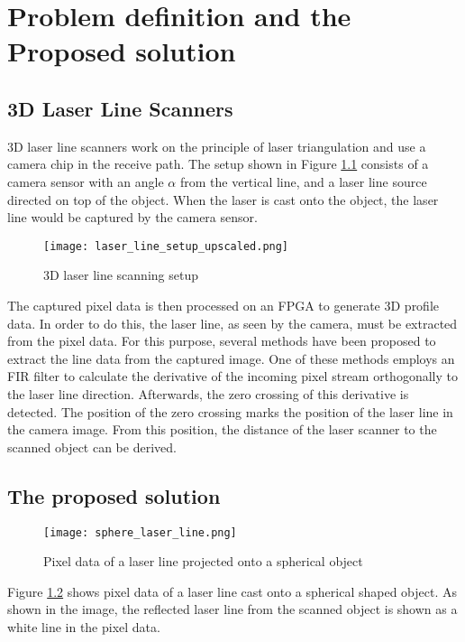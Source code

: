 \chapter{Problem definition and the Proposed solution}

\section{3D Laser Line Scanners}


3D laser line scanners work on the principle of laser triangulation and use a camera chip in the receive path. The setup shown in Figure \ref{fig:laser_line_setup} consists of a camera sensor with an angle $\alpha$ from the vertical line, and a laser line source directed on top of the object. When the laser is cast onto the object, the laser line would be captured by the camera sensor.


\begin{figure}[h]
    \centering
    \texttt{[image: laser\_line\_setup\_upscaled.png]}
    \caption{3D laser line scanning setup \cite{method_presentation}}
    \label{fig:laser_line_setup}
\end{figure}


The captured pixel data is then processed on an FPGA to generate 3D profile data. In order to do this, the laser line, as seen by the camera, must be extracted from the pixel data. For this purpose, several methods have been proposed to extract the line data from the captured image. One of these methods employs an FIR filter to calculate the derivative of the incoming pixel stream orthogonally to the laser line direction. Afterwards, the zero crossing of this derivative is detected. The position of the zero crossing marks the position of the laser line in the camera image. From this position, the distance of the laser scanner to the scanned object can be derived.


\section{The proposed solution}


\begin{figure}[h]
    \centering
    \texttt{[image: sphere\_laser\_line.png]}
    \caption{Pixel data of a laser line projected onto a spherical object}
    \label{fig:sphere_laser_line}
\end{figure}


Figure \ref{fig:sphere_laser_line} shows pixel data of a laser line cast onto a spherical shaped object. As shown in the image, the reflected laser line from the scanned object is shown as a white line in the pixel data.

